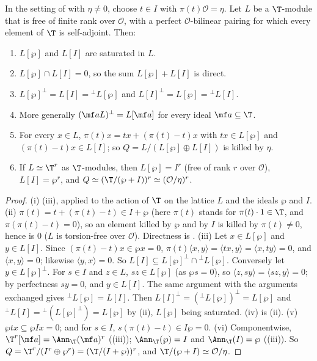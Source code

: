 \begin{proposition}\label{prop:modules:ddt-ingredients}
In the setting of  with $\eta\ne0$, choose $t\in I$ with $\pi(t)\mathcal O=\eta$. Let $L$ be a $\T$-module that is free of finite rank over
$\mathcal O$, with a perfect $\mathcal O$-bilinear pairing for which every element of $\T$ is self-adjoint. Then:
\begin{enumerate}[label=(\roman*)]
\item $L[\wp]$ and $L[I]$ are saturated in $L$.
\item $L[\wp]\cap L[I]=0$, so the sum $L[\wp]+L[I]$ is direct.
\item $L[\wp]^\perp=L[I]={}^\perp L[\wp]$ and $L[I]^\perp=L[\wp]={}^\perp L[I]$.
\item More generally $(\mf aL)^\perp=L[\mf a]$ for every ideal $\mf a\subseteq\T$.
\item For every $x\in L$, $\pi(t)x=tx+(\pi(t)-t)x$ with $tx\in L[\wp]$ and $(\pi(t)-t)x\in L[I]$; so $Q=L/(L[\wp]\oplus L[I])$ is killed by $\eta$.
\item If $L\simeq\T^r$ as $\T$-modules, then $L[\wp]=I^r$ (free of rank $r$ over $\mathcal O$), $L[I]=\wp^r$, and $Q\simeq(\T/(\wp+I))^r\simeq(\mathcal O/\eta)^r$.
\end{enumerate}
\end{proposition}

\begin{proof}
(i) (iii), applied to the action of $\T$ on the lattice $L$ and the ideals $\wp$ and $I$. (ii) $\pi(t)=t+(\pi(t)-t)\in I+\wp$
(here $\pi(t)$ stands for $\pi(t)\cdot1\in\T$, and $\pi(\pi(t)-t)=0$), so an element killed by $\wp$ and by $I$ is killed by $\pi(t)\ne0$, hence is $0$ ($L$ is torsion-free
over $\mathcal O$). Directness is .
(iii) Let $x\in L[\wp]$ and $y\in L[I]$. Since $(\pi(t)-t)x\in\wp x=0$, $\pi(t)\langle x,y\rangle=\langle tx,y\rangle=\langle x,ty\rangle=0$, and $\langle x,y\rangle=0$; likewise $\langle y,x\rangle=0$. So
$L[I]\subseteq L[\wp]^\perp\cap{}^\perp L[\wp]$. Conversely let $y\in L[\wp]^\perp$. For $s\in I$ and $z\in L$, $sz\in L[\wp]$ (as $\wp s=0$), so $\langle z,sy\rangle=\langle sz,y\rangle=0$;
by perfectness $sy=0$, and $y\in L[I]$. The same argument with the arguments exchanged gives ${}^\perp L[\wp]=L[I]$. Then $L[I]^\perp=({}^\perp L[\wp])^\perp=L[\wp]$
and ${}^\perp L[I]={}^\perp(L[\wp]^\perp)=L[\wp]$ by (ii), $L[\wp]$ being saturated.
(iv) is (ii).
(v) $\wp tx\subseteq\wp Ix=0$; and for $s\in I$, $s(\pi(t)-t)\in I\wp=0$.
(vi) Componentwise, $\T^r[\mf a]=\Ann_\T(\mf a)^r$ ((iii)); $\Ann_\T(\wp)=I$ and $\Ann_\T(I)=\wp$ ((iii)). So
$Q=\T^r/(I^r\oplus\wp^r)=(\T/(I+\wp))^r$, and $\T/(\wp+I)\simeq\mathcal O/\eta$.
\end{proof}

